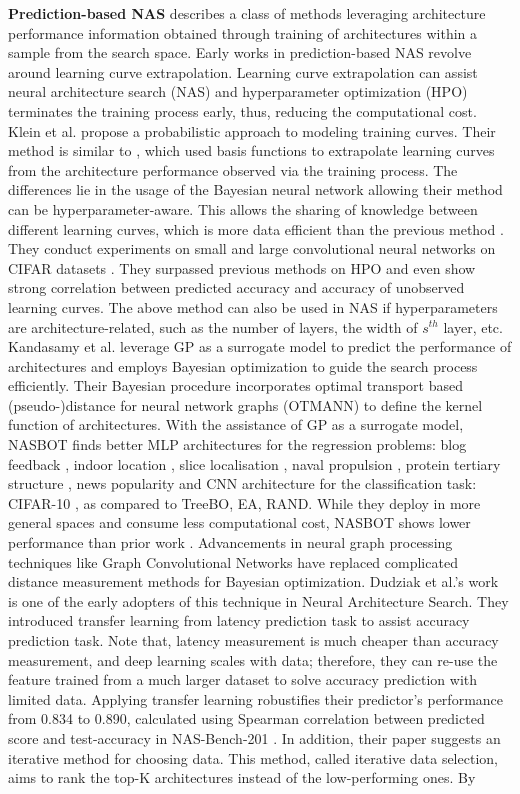 \documentclass[lettersize,journal]{IEEEtran}
\begin{document}
\textbf{Prediction-based NAS} describes a class of methods leveraging architecture performance information obtained through training of architectures within a sample from the search space. Early works in prediction-based NAS revolve around learning curve extrapolation. Learning curve extrapolation can assist neural architecture search (NAS) and hyperparameter optimization (HPO) terminates the training process early, thus, reducing the computational cost. Klein et al. \cite{learningcurve} propose a probabilistic approach to modeling training curves. Their method is similar to \cite{sppedup}, which used basis functions to extrapolate learning curves from the architecture performance observed via the training process. The differences lie in the usage of the Bayesian neural network allowing their method can be hyperparameter-aware. This allows the sharing of knowledge between different learning curves, which is more data efficient than the previous method \cite{sppedup}. They conduct experiments on small and large convolutional neural networks on CIFAR datasets \cite{cifar}. They surpassed previous methods on HPO and even show strong correlation between predicted accuracy and accuracy of unobserved learning curves. The above method can also be used in NAS if hyperparameters are architecture-related, such as the number of layers, the width of $s^{th}$ layer, etc. Kandasamy et al. \cite{nasbot} leverage GP as a surrogate model to predict the performance of architectures and employs Bayesian optimization to guide the search process efficiently. Their Bayesian procedure incorporates optimal transport based (pseudo-)distance for neural network graphs (OTMANN) to define the kernel function of architectures. With the assistance of GP as a surrogate model, NASBOT finds better MLP architectures for the regression problems: blog feedback \cite{blog}, indoor location \cite{indoor}, slice localisation \cite{slice}, naval propulsion \cite{naval}, protein tertiary structure \cite{protein}, news popularity \cite{news} and CNN architecture for the classification task: CIFAR-10 \cite{cifar}, as compared to TreeBO, EA, RAND. While they deploy in more general spaces and consume less computational cost, NASBOT shows lower performance than prior work \cite{ProgressiveNAS, HierarchicalNAS, rl1}. Advancements in neural graph processing techniques like Graph Convolutional Networks \cite{gnn} have replaced complicated distance measurement methods for Bayesian optimization. Dudziak et al.'s work \cite{BRP-NAS} is one of the early adopters of this technique in Neural Architecture Search. They introduced transfer learning from latency prediction task to assist accuracy prediction task. Note that, latency measurement is much cheaper than accuracy measurement, and deep learning scales with data; therefore, they can re-use the feature trained from a much larger dataset to solve accuracy prediction with limited data. Applying transfer learning robustifies their predictor's performance from 0.834 to 0.890, calculated using Spearman correlation between predicted score and test-accuracy in NAS-Bench-201 \cite{nb201}. In addition, their paper suggests an iterative method for choosing data. This method, called iterative data selection, aims to rank the top-K architectures instead of the low-performing ones. By 
\end{document}
